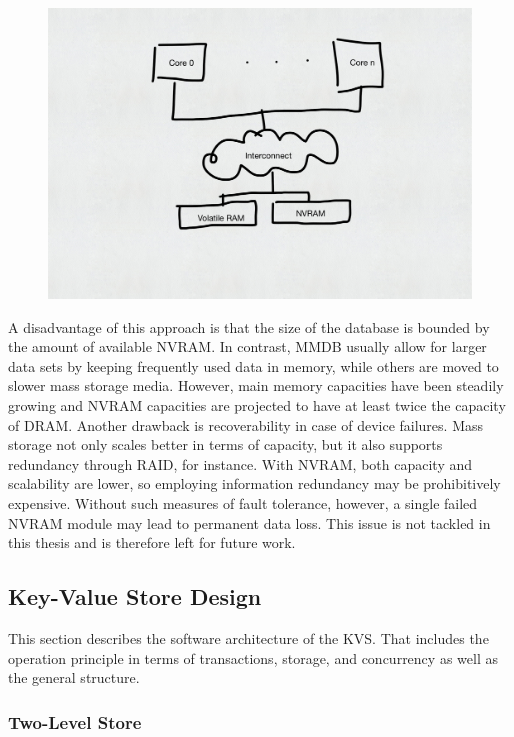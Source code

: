 \begin{figure}[!ht]
    \centering
    \includegraphics[scale=0.5]{figures/drafts/concept-sys-mem.pdf}
    \caption{}
    \label{fig:concept-sys-mem}
\end{figure}

A disadvantage of this approach is that the size of the database is bounded by
the amount of available NVRAM. In contrast, MMDB usually allow for larger data
sets by keeping frequently used data in memory, while others are moved to slower
mass storage media. However, main memory capacities have been steadily growing
and NVRAM capacities are projected to have at least twice the capacity of DRAM.
Another drawback is recoverability in case of device failures. Mass storage not
only scales better in terms of capacity, but it also supports redundancy through
RAID, for instance. With NVRAM, both capacity and scalability are lower, so
employing information redundancy may be prohibitively expensive. Without such
measures of fault tolerance, however, a single failed NVRAM module may lead to
permanent data loss. This issue is not tackled in this thesis and is therefore
left for future work.

\subsection{Key-Value Store Design}

This section describes the software architecture of the KVS. That includes the
operation principle in terms of transactions, storage, and concurrency as well
as the general structure.

\subsubsection{Two-Level Store}

